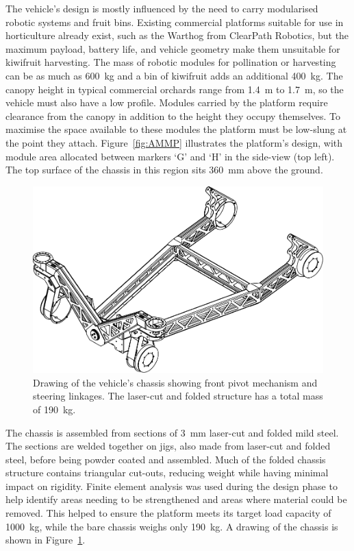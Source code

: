 \documentclass[preprint,authoryear,12pt]{elsarticle}
\begin{document}
        The vehicle's design is mostly influenced by the need to carry modularised robotic systems and fruit bins.
        Existing commercial platforms suitable for use in horticulture already exist, such as the Warthog from ClearPath Robotics, but the maximum payload, battery life, and vehicle geometry make them unsuitable for kiwifruit harvesting.
        The mass of robotic modules for pollination or harvesting can be as much as \SI{600}{\kilo\gram} and a bin of kiwifruit adds an additional \SI{400}{\kilo\gram}.
        The canopy height in typical commercial orchards range from \SI{1.4}{\meter} to \SI{1.7}{\meter}, so the vehicle must also have a low profile.
        Modules carried by the platform require clearance from the canopy in addition to the height they occupy themselves.
        To maximise the space available to these modules the platform must be low-slung at the point they attach.
        Figure~\ref{fig:AMMP} illustrates the platform's design, with module area allocated between markers `G' and `H' in the side-view (top left).
        The top surface of the chassis in this region sits \SI{360}{\milli\meter} above the ground.

        \begin{figure}[htb]
            \centering
            \includegraphics[width=0.6\linewidth]{imgs/profile_views/AMMP-Chassis-1-20.pdf}
            \caption{Drawing of the vehicle's chassis showing front pivot mechanism and steering linkages. The laser-cut and folded structure has a total mass of \SI{190}{\kilo\gram}.}
            \label{fig:AMMPChassis}
        \end{figure}

        The chassis is assembled from sections of \SI{3}{\milli\meter} laser-cut and folded mild steel.
        The sections are welded together on jigs, also made from laser-cut and folded steel, before being powder coated and assembled.
        Much of the folded chassis structure contains triangular cut-outs, reducing weight while having minimal impact on rigidity.
        Finite element analysis was used during the design phase to help identify areas needing to be strengthened and areas where material could be removed.
        This helped to ensure the platform meets its target load capacity of \SI{1000}{\kilo\gram}, while the bare chassis weighs only \SI{190}{\kilo\gram}.
        A drawing of the chassis is shown in Figure~\ref{fig:AMMPChassis}.
\end{document}
